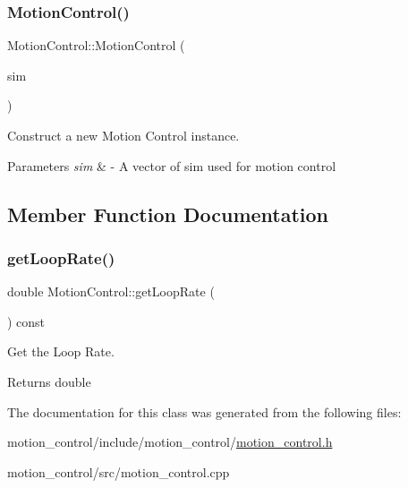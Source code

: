 \subsubsection{\texorpdfstring{Motion\+Control()}{MotionControl()}\hspace{0.1cm}{\footnotesize\ttfamily [2/2]}}
{\footnotesize\ttfamily Motion\+Control\+::\+Motion\+Control (\begin{DoxyParamCaption}\item[{const std\+::vector$<$ \hyperlink{classBasicRobotSim}{Basic\+Robot\+Sim} $\ast$$>$ \&}]{sim }\end{DoxyParamCaption})\hspace{0.3cm}{\ttfamily [explicit]}}



Construct a new Motion Control instance. 


\begin{DoxyParams}{Parameters}
{\em sim} & -\/ A vector of sim used for motion control \\
\hline
\end{DoxyParams}


\subsection{Member Function Documentation}
\mbox{\label{classMotionControl_aa54a9d8ce253dce201af950a2d7c12b5}} 
\subsubsection{\texorpdfstring{get\+Loop\+Rate()}{getLoopRate()}}
{\footnotesize\ttfamily double Motion\+Control\+::get\+Loop\+Rate (\begin{DoxyParamCaption}{ }\end{DoxyParamCaption}) const}



Get the Loop Rate. 

\begin{DoxyReturn}{Returns}
double 
\end{DoxyReturn}


The documentation for this class was generated from the following files\+:\begin{DoxyCompactItemize}
\item 
motion\+\_\+control/include/motion\+\_\+control/\hyperlink{motion__control_8h}{motion\+\_\+control.\+h}\item 
motion\+\_\+control/src/motion\+\_\+control.\+cpp\end{DoxyCompactItemize}
